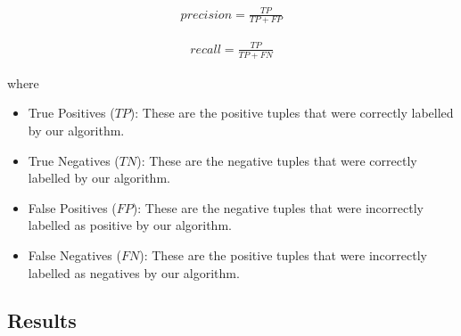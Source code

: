\begin{eqnarray}
precision = \frac{TP}{TP + FP}
\end{eqnarray}  

\begin{eqnarray}
recall = \frac{TP}{TP + FN}
\end{eqnarray}  

where 

\begin{itemize}
  \item True Positives ($TP$): These are the positive tuples that were correctly labelled by our algorithm. 
  \item True Negatives ($TN$): These are the negative tuples that were correctly labelled by our algorithm.
  \item False Positives ($FP$): These are the negative tuples that were incorrectly labelled as positive by our algorithm.
  \item False Negatives ($FN$): These are the positive tuples that were incorrectly labelled as negatives by our algorithm.
\end{itemize}\vspace{15pt}

\subsection{Results}

